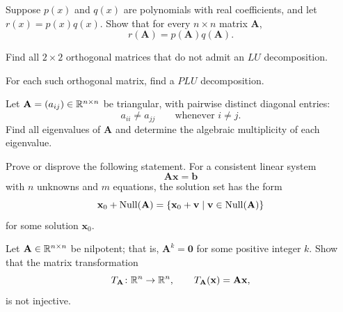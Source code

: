 \begin{problem}
Suppose $p(x)$ and $q(x)$ are polynomials with real coefficients, and let $r(x)=p(x)q(x)$. Show that for every $n\times n$ matrix $\mathbf A$,
\[
r(\mathbf A)=p(\mathbf A)q(\mathbf A).
\]
\end{problem}

\begin{problem}
\begin{problemsubparts}
\item Find all $2\times2$ orthogonal matrices that do not admit an $LU$ decomposition.
\item For each such orthogonal matrix, find a $PLU$ decomposition.
\end{problemsubparts}
\end{problem}

\begin{problem}
Let $\mathbf A=(a_{ij})\in\mathbb{R}^{n\times n}$ be triangular, with pairwise distinct diagonal entries:
\[
a_{ii}\ne a_{jj}
\qquad\text{whenever }i\ne j.
\]
Find all eigenvalues of $\mathbf A$ and determine the algebraic multiplicity of each eigenvalue.
\end{problem}

\begin{problem}
Prove or disprove the following statement. For a consistent linear system
\[
\mathbf A\mathbf x=\mathbf b
\]
with $n$ unknowns and $m$ equations, the solution set has the form
\[
\mathbf x_0+\operatorname{Null}(\mathbf A)
=
\{\mathbf x_0+\mathbf v\mid \mathbf v\in\operatorname{Null}(\mathbf A)\}
\]
for some solution $\mathbf x_0$.
\end{problem}

\begin{problem}
Let $\mathbf A\in\mathbb{R}^{n\times n}$ be nilpotent; that is, $\mathbf A^k=\mathbf0$ for some positive integer $k$. Show that the matrix transformation
\[
T_{\mathbf A}\colon\mathbb{R}^n\to\mathbb{R}^n,
\qquad
T_{\mathbf A}(\mathbf x)=\mathbf A\mathbf x,
\]
is not injective.
\end{problem}

